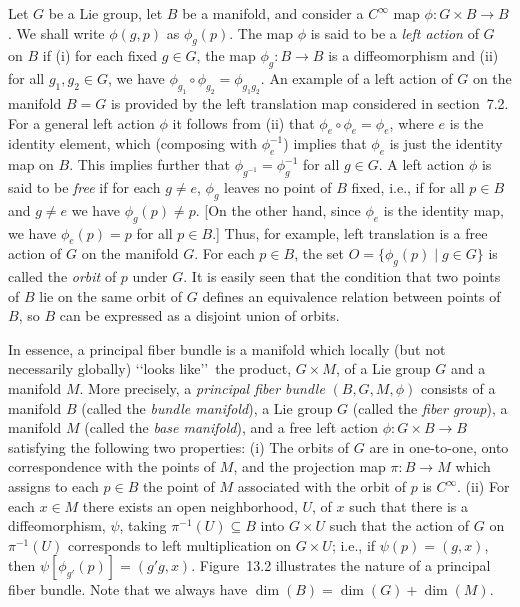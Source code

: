 Let \(G\) be a Lie group, let \(B\) be a manifold, and consider a \(C^\infty\) map
\(\phi:G\times B\longrightarrow B\). We shall write \(\phi(g,p)\) as
\(\phi_g(p)\). The map \(\phi\) is said to be a \emph{left action} of \(G\) on \(B\)
if (i) for each fixed \(g\in G\), the map \(\phi_g:B\longrightarrow B\) is a
diffeomorphism and (ii) for all \(g_1,g_2\in G\), we have
\(\phi_{g_1}\circ\phi_{g_2}=\phi_{g_1g_2}\). An example of a left action of \(G\)
on the manifold \(B=G\) is provided by the left translation map considered in
section~7.2. For a general left action \(\phi\) it follows from (ii) that
\(\phi_e\circ\phi_e=\phi_e\), where \(e\) is the identity element, which (composing
with \(\phi_e^{-1}\)) implies that \(\phi_e\) is just the identity map on \(B\). This
implies further that \(\phi_{g^{-1}}=\phi_g^{-1}\) for all \(g\in G\). A left action
\(\phi\) is said to be \emph{free} if for each \(g\ne e\), \(\phi_g\) leaves no point
of \(B\) fixed, i.e., if for all \(p\in B\) and \(g\ne e\) we have
\(\phi_g(p)\ne p\). [On the other hand, since \(\phi_e\) is the identity map, we have
\(\phi_e(p)=p\) for all \(p\in B\).] Thus, for example, left translation is a free
action of \(G\) on the manifold \(G\). For each \(p\in B\), the set
\(O=\{\phi_g(p)\mid g\in G\}\) is called the \emph{orbit} of \(p\) under \(G\). It is
easily seen that the condition that two points of \(B\) lie on the same orbit of
\(G\) defines an equivalence relation between points of \(B\), so \(B\) can be
expressed as a disjoint union of orbits.

In essence, a principal fiber bundle is a manifold which locally (but not necessarily
globally) \lq\lq looks like\rq\rq\ the product, \(G\times M\), of a Lie group \(G\)
and a manifold \(M\). More precisely, a \emph{principal fiber bundle}
\((B,G,M,\phi)\) consists of a manifold \(B\) (called the \emph{bundle manifold}), a
Lie group \(G\) (called the \emph{fiber group}), a manifold \(M\) (called the
\emph{base manifold}), and a free left action
\(\phi:G\times B\longrightarrow B\) satisfying the following two properties: (i)
The orbits of \(G\) are in one-to-one, onto correspondence with the points of
\(M\), and the projection map \(\pi:B\longrightarrow M\) which assigns to each
\(p\in B\) the point of \(M\) associated with the orbit of \(p\) is \(C^\infty\).
(ii) For each \(x\in M\) there exists an open neighborhood, \(U\), of \(x\) such
that there is a diffeomorphism, \(\psi\), taking \(\pi^{-1}(U)\subseteq B\) into
\(G\times U\) such that the action of \(G\) on \(\pi^{-1}(U)\) corresponds to left
multiplication on \(G\times U\); i.e., if \(\psi(p)=(g,x)\), then
\(\psi[\phi_{g'}(p)]=(g'g,x)\). Figure~13.2 illustrates the nature of a principal
fiber bundle. Note that we always have
\(\dim(B)=\dim(G)+\dim(M)\).

